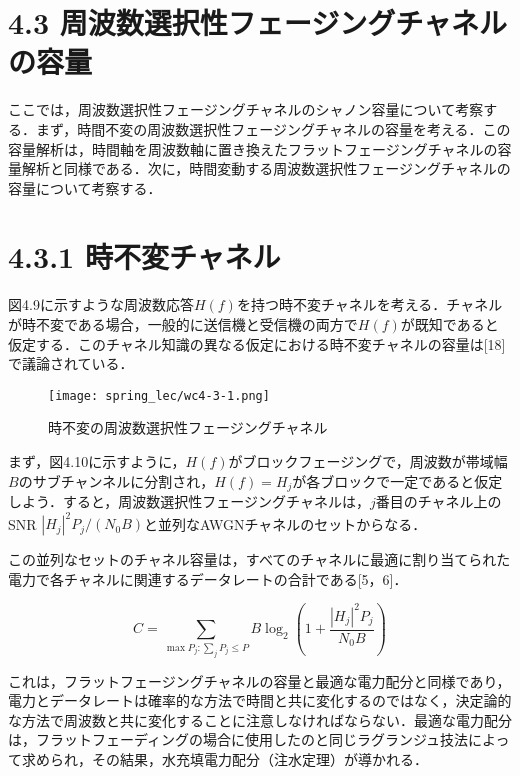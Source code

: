 \documentclass[dvipdfmx]{jsarticle}
\begin{document}
\section*{4.3 周波数選択性フェージングチャネルの容量}

ここでは，周波数選択性フェージングチャネルのシャノン容量について考察する．まず，時間不変の周波数選択性フェージングチャネルの容量を考える．この容量解析は，時間軸を周波数軸に置き換えたフラットフェージングチャネルの容量解析と同様である．次に，時間変動する周波数選択性フェージングチャネルの容量について考察する．

\section*{4.3.1 時不変チャネル}

図4.9に示すような周波数応答$H(f)$を持つ時不変チャネルを考える．チャネルが時不変である場合，一般的に送信機と受信機の両方で$H(f)$が既知であると仮定する．このチャネル知識の異なる仮定における時不変チャネルの容量は[18]で議論されている．

\begin{figure}[htbp]
\begin{center}
\texttt{[image: spring\_lec/wc4-3-1.png]}
\end{center}
\caption{時不変の周波数選択性フェージングチャネル}
\end{figure}

まず，図4.10に示すように，$H(f)$がブロックフェージングで，周波数が帯域幅$B$のサブチャンネルに分割され，$H(f) = H_j$が各ブロックで一定であると仮定しよう．すると，周波数選択性フェージングチャネルは，$j$番目のチャネル上のSNR $|H_j|^2 P_j / (N_0 B)$と並列なAWGNチャネルのセットからなる．

この並列なセットのチャネル容量は，すべてのチャネルに最適に割り当てられた電力で各チャネルに関連するデータレートの合計である[5，6]．

\begin{equation}\label{}
C = \sum_{\max P_j : \sum_j P_j \leq P} B \log_2 (1 + \frac{|H_j|^2 P_j}{N_0 B})
\tag{4.23}
\end{equation}

\noindent
これは，フラットフェージングチャネルの容量と最適な電力配分と同様であり，電力とデータレートは確率的な方法で時間と共に変化するのではなく，決定論的な方法で周波数と共に変化することに注意しなければならない．最適な電力配分は，フラットフェーディングの場合に使用したのと同じラグランジュ技法によって求められ，その結果，水充填電力配分（注水定理）が導かれる．
\end{document}
